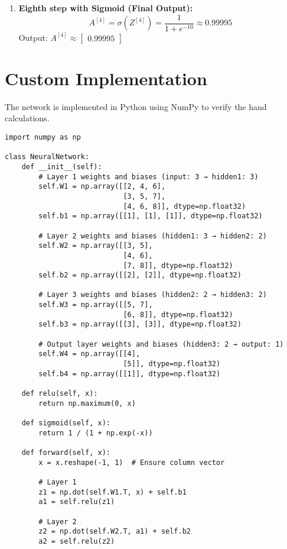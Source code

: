 \documentclass[a4paper,12pt]{article}
\begin{document}
\begin{enumerate}
    \item \textbf{Eighth step with Sigmoid (Final Output):}
    \[
    A^{[4]} = \sigma(Z^{[4]}) = \frac{1}{1 + e^{-10}} \approx 0.99995
    \]
    Output: \( A^{[4]} \approx \begin{bmatrix} 0.99995 \end{bmatrix} \)
\end{enumerate}

\newpage
\section{Custom Implementation}
The network is implemented in Python using NumPy to verify the hand calculations.

\lstset{language=Python}
\begin{lstlisting}
import numpy as np

class NeuralNetwork:
    def __init__(self):
        # Layer 1 weights and biases (input: 3 → hidden1: 3)
        self.W1 = np.array([[2, 4, 6],
                            [3, 5, 7],
                            [4, 6, 8]], dtype=np.float32)
        self.b1 = np.array([[1], [1], [1]], dtype=np.float32)

        # Layer 2 weights and biases (hidden1: 3 → hidden2: 2)
        self.W2 = np.array([[3, 5],
                            [4, 6],
                            [7, 8]], dtype=np.float32)
        self.b2 = np.array([[2], [2]], dtype=np.float32)

        # Layer 3 weights and biases (hidden2: 2 → hidden3: 2)
        self.W3 = np.array([[5, 7],
                            [6, 8]], dtype=np.float32)
        self.b3 = np.array([[3], [3]], dtype=np.float32)

        # Output layer weights and biases (hidden3: 2 → output: 1)
        self.W4 = np.array([[4],
                            [5]], dtype=np.float32)
        self.b4 = np.array([[1]], dtype=np.float32)

    def relu(self, x):
        return np.maximum(0, x)

    def sigmoid(self, x):
        return 1 / (1 + np.exp(-x))

    def forward(self, x):
        x = x.reshape(-1, 1)  # Ensure column vector

        # Layer 1
        z1 = np.dot(self.W1.T, x) + self.b1
        a1 = self.relu(z1)

        # Layer 2
        z2 = np.dot(self.W2.T, a1) + self.b2
        a2 = self.relu(z2)


\end{lstlisting}
\end{document}
